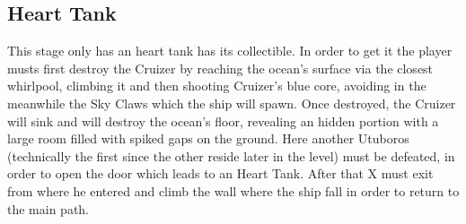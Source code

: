 \subsection{Heart Tank}
This stage only has an heart tank has its collectible. In order to get it the player musts first destroy the Cruizer by reaching the ocean's surface via the closest whirlpool, climbing it and then shooting Cruizer's blue core, avoiding in the meanwhile the Sky Claws which the ship will spawn. Once destroyed, the Cruizer will sink and will destroy the ocean's floor, revealing an hidden portion with a large room filled with spiked gaps on the ground. Here another Utuboros (technically the first since the other reside later in the level) must be defeated, in order to open the door which leads to an Heart Tank. After that X must exit from where he entered and climb the wall where the ship fall in order to return to the main path.
